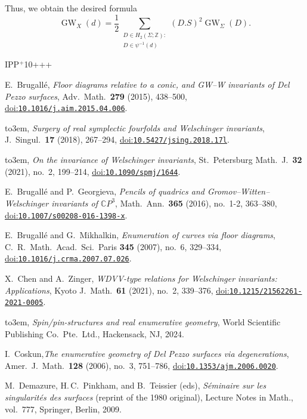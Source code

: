 \documentclass[10pt,a4paper]{article}
\numberwithin{equation}{section}
\newcommand{\doi}[1]{\href{https://doi.org/#1}{doi:\nolinkurl{#1}}}
\providecommand{\bysame}{\leavevmode\hbox to3em{\hrulefill}\thinspace}
\theoremstyle{definition}
\theoremstyle{plain}
\theoremstyle{remark}
\newcommand{\Z}{\mathbb{Z}}
\DeclareMathOperator{\GW}{GW}
\begin{document}
Thus, we obtain the desired formula
          $$\GW_X(d)=\frac{1}{2}\sum_{\substack{D\in H_2(\Sigma;\Z):\\
          D\in \psi^{-1}(d)}}(D.S)^2 \GW_{\Sigma}(D).$$

\newcommand{\etalchar}[1]{$^{#1}$}

\begin{thebibliography}{IPP{\etalchar{+}}10+++}

E.~Brugall{\'e}, \emph{Floor diagrams relative to a conic, and {GW}--{W}
  invariants of {D}el {P}ezzo surfaces}, Adv.\ Math.\ \textbf{279}
  (2015), 438--500, \doi{10.1016/j.aim.2015.04.006}.

\bysame, \emph{Surgery of real symplectic fourfolds and {W}elschinger
  invariants}, J.~Singul.\ \textbf{17} (2018), 267--294,
\doi{10.5427/jsing.2018.17l}.

  \bysame, \emph{On the invariance of {W}elschinger invariants},
  St.\ Petersburg Math.~J.\ \textbf{32} (2021), no.~2, 199--214,
\doi{10.1090/spmj/1644}.

E.~Brugall{\'e} and P.~Georgieva, \emph{Pencils of quadrics and
  {G}romov--{W}itten--{W}elschinger invariants of $\mathbb{C} {P}^3$},
  Math.\ Ann.\ \textbf{365} (2016), no.~1-2, 363--380,
\doi{10.1007/s00208-016-1398-x}.

E.~Brugall{\'e} and G.~Mikhalkin, \emph{Enumeration of curves via floor
  diagrams}, C.~R.~Math.\ Acad.\ Sci.\ Paris \textbf{345} (2007), no.~6, 329--334,
\doi{10.1016/j.crma.2007.07.026}.

X.~Chen and A.~Zinger, \emph{WDVV-type relations for {W}elschinger
  invariants: {A}pplications}, Kyoto J.~Math.\ \textbf{61} (2021),
  no.~2, 339--376, \doi{10.1215/21562261-2021-0005}.

\bysame, \emph{Spin/pin-structures and real enumerative geometry}, World
  Scientific Publishing Co.\ Pte.\ Ltd., Hackensack, NJ, 2024.

  I.~Coskun,\emph{The enumerative geometry of Del Pezzo surfaces via degenerations}, Amer.~J.\ Math.\ \textbf{128} (2006), no.~3, 751--786, \doi{10.1353/ajm.2006.0020}.

M.~Demazure, H.\,C.~Pinkham, and B.~Teissier (eds), \emph{S{\'e}minaire sur les
singularit{\'e}s des surfaces} (reprint of the 1980 original), Lecture Notes in Math., vol.~777, Springer, Berlin, 2009.


\end{thebibliography}
\end{document}
